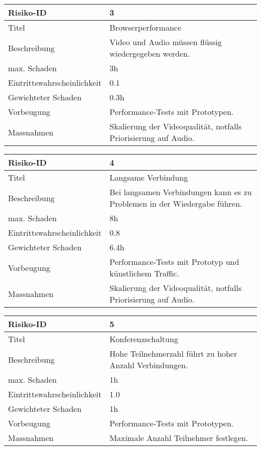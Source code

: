 	
\noindent
\begin{tabular}{|p{} | p{} |}
	\hline	
	Risiko-ID & 3 \\
	\hline
	Titel & Browserperformance \\
	Beschreibung & Video und Audio müssen flüssig wiedergegeben werden. \\
	max. Schaden	& 3h \\
	Eintrittswahrscheinlichkeit & 0.1 \\
	Gewichteter Schaden	& 0.3h \\
	Vorbeugung	& Performance-Tests mit Prototypen. \\
	Massnahmen	& Skalierung der Videoqualität, notfalls Priorisierung auf Audio. \\
	\hline
\end{tabular}
\hspace{0.5cm}
\newline
	
	
\noindent
\begin{tabular}{|p{} | p{} |}
	\hline	
	Risiko-ID & 4 \\
	\hline
	Titel & Langsame Verbindung \\
	Beschreibung & Bei langsamen Verbindungen kann es zu Problemen in der
	Wiedergabe führen. \\
	max. Schaden	& 8h \\
	Eintrittswahrscheinlichkeit & 0.8 \\
	Gewichteter Schaden	& 6.4h \\
	Vorbeugung	& Performance-Tests mit Prototyp und künstlichem Traffic. \\
	Massnahmen	& Skalierung der Videoqualität, notfalls Priorisierung auf Audio. \\
	\hline
\end{tabular}
\hspace{0.5cm}
\newline
	
	
\noindent
\begin{tabular}{|p{} | p{} |}
	\hline	
	Risiko-ID & 5 \\
	\hline
	Titel & Konferenzschaltung \\
	Beschreibung & Hohe Teilnehmerzahl führt zu hoher Anzahl Verbindungen. \\
	max. Schaden	& 1h \\
	Eintrittswahrscheinlichkeit & 1.0 \\
	Gewichteter Schaden	& 1h \\
	Vorbeugung	& Performance-Tests mit Prototypen. \\
	Massnahmen	& Maximale Anzahl Teilnehmer festlegen. \\
	\hline
\end{tabular}
\hspace{0.5cm}
\newline

